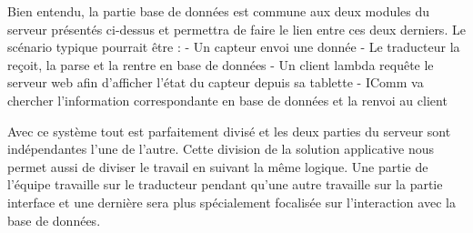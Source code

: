 Bien entendu, la partie base de données est commune aux deux modules du serveur présentés ci-dessus et permettra de faire le lien entre ces deux derniers. Le scénario typique pourrait être :
- Un capteur envoi une donnée
- Le traducteur la reçoit, la parse et la rentre en base de données
- Un client lambda requête le serveur web afin d'afficher l'état du capteur depuis sa tablette
- IComm va chercher l'information correspondante en base de données et la renvoi au client

Avec ce système tout est parfaitement divisé et les deux parties du serveur sont indépendantes l'une de l'autre. Cette division de la solution applicative nous permet aussi de diviser le travail en suivant la même logique. Une partie de l'équipe travaille sur le traducteur pendant qu'une autre travaille sur la partie interface et une dernière sera plus spécialement focalisée sur l'interaction avec la base de données.